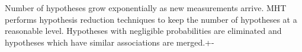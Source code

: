 \documentclass{article}
\begin{document}
Number of hypotheses grow exponentially as new measurements arrive. MHT performs hypothesis reduction techniques to keep the number of hypotheses at a reasonable level. Hypotheses with negligible probabilities are eliminated and hypotheses which have similar associations are merged.+-


\end{document}

